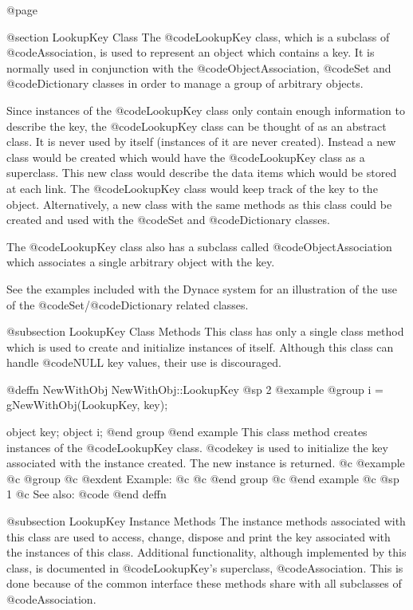 @page

@section LookupKey Class
The @code{LookupKey} class, which is a subclass of @code{Association},
is used to represent an object which contains a key.  It is normally
used in conjunction with the @code{ObjectAssociation}, @code{Set} and
@code{Dictionary} classes in order to manage a group of arbitrary
objects.

Since instances of the @code{LookupKey} class only contain enough
information to describe the key, the @code{LookupKey} class can be
thought of as an abstract class.  It is never used by itself (instances
of it are never created).  Instead a new class would be created which
would have the @code{LookupKey} class as a superclass.  This new class
would describe the data items which would be stored at each link.  The
@code{LookupKey} class would keep track of the key to the object.
Alternatively, a new class with the same methods as this class could be
created and used with the @code{Set} and @code{Dictionary} classes.

The @code{LookupKey} class also has a subclass called
@code{ObjectAssociation} which associates a single arbitrary object with
the key.

See the examples included with the Dynace system for an illustration of the
use of the @code{Set}/@code{Dictionary} related classes.



@subsection LookupKey Class Methods
This class has only a single class method which is used to create and
initialize instances of itself.   Although this class can handle
@code{NULL} key values, their use is discouraged.






@deffn {NewWithObj} NewWithObj::LookupKey
@sp 2
@example
@group
i = gNewWithObj(LookupKey, key);

object  key;
object  i;
@end group
@end example
This class method creates instances of the @code{LookupKey} class.
@code{key} is used to initialize the key associated with the instance
created.  The new instance is returned.
@c @example
@c @group
@c @exdent Example:
@c 
@c @end group
@c @end example
@c @sp 1
@c See also:  @code{}
@end deffn




@subsection LookupKey Instance Methods
The instance methods associated with this class are used to access, change,
dispose and print the key associated with the instances of this class.
Additional functionality, although implemented by this class, is documented
in @code{LookupKey}'s superclass, @code{Association}.  This is done
because of the common interface these methods share with all subclasses
of @code{Association}.







